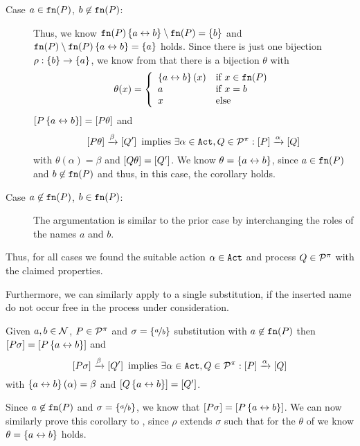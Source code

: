 \begin{prf}
\begin{description}
\item[Case $a\in\mathtt{fn}(P)$, $b\not\in\mathtt{fn}(P)$:] Thus, we know $\fn{P}\transp{a}{b}\setminus\fn{P}=\set{b}$ and $\fn{P}\setminus\fn{P}\transp{a}{b}=\set{a}$ holds. Since there is just one bijection $\rho:\set{b}\rightarrow\set{a}$, we know from  that there is a bijection $\theta$ with
\[\theta(x)=\left\{\begin{array}{ll}
			\left\{a\leftrightarrow{}b\right\}(x) & \text{if } x\in\mathtt{fn}(P) \\	
			a & \text{if } x=b	\\	
			x & \text{else}
		\end{array}\right.\]
$\left[P\left\{a\leftrightarrow{}b\right\}\right]=\left[P\theta\right]$ and
\[\left[P\theta\right]\xrightarrow{\beta}\left[Q'\right] \text{ implies } \exists\alpha\in\mathtt{Act},Q\in\mathcal P^{\pi}:\left[P\right]\xrightarrow{\alpha}\left[Q\right]\]
with $\theta(\alpha)=\beta$ and $\left[Q\theta\right]=\left[Q'\right]$. We know $\theta=\left\{a\leftrightarrow{}b\right\}$, since $a\in\mathtt{fn}(P)$ and $b\not\in\mathtt{fn}(P)$ and thus, in this case, the corollary holds.

\item[Case $a\not\in\mathtt{fn}(P)$, $b\in\mathtt{fn}(P)$:] The argumentation is similar to the prior case by interchanging the roles of the names $a$ and $b$.
\end{description}

Thus, for all cases we found the suitable action $\alpha\in\mathtt{Act}$ and process $Q\in\mathcal P^{\pi}$ with the claimed properties.
\end{prf}

Furthermore, we can similarly apply  to a single substitution, if the inserted name do not occur free in the process under consideration.

\begin{cor}
\label{cor_subst_trans_partIV}
Given $a,b\in\mathcal N$, $P\in\mathcal P^{\pi}$ and $\sigma=\left\{\nicefrac{a}{b}\right\}$ substitution with $a\not\in\mathtt{fn}(P)$ then $\left[P\sigma\right]=\left[P\left\{a\leftrightarrow{}b\right\}\right]$ and
\[\left[P\sigma\right]\xrightarrow{\beta}\left[Q'\right]\text{ implies } \exists\alpha\in\mathtt{Act},Q\in\mathcal P^{\pi}: \left[P\right]\xrightarrow{\alpha}\left[Q\right]\]
with $\left\{a\leftrightarrow{}b\right\}(\alpha)=\beta$ and $\left[Q\left\{a\leftrightarrow{}b\right\}\right]=\left[Q'\right]$.
\end{cor}
\begin{prf}
Since $a\not\in\mathtt{fn}(P)$ and $\sigma=\left\{\nicefrac{a}{b}\right\}$, we know that $\left[P\sigma\right]=\left[P\left\{a\leftrightarrow{}b\right\}\right]$. We can now similarly prove this corollary to , since $\rho$ extends $\sigma$ such that for the $\theta$ of  we know $\theta=\left\{a\leftrightarrow{}b\right\}$ holds.
\end{prf}

